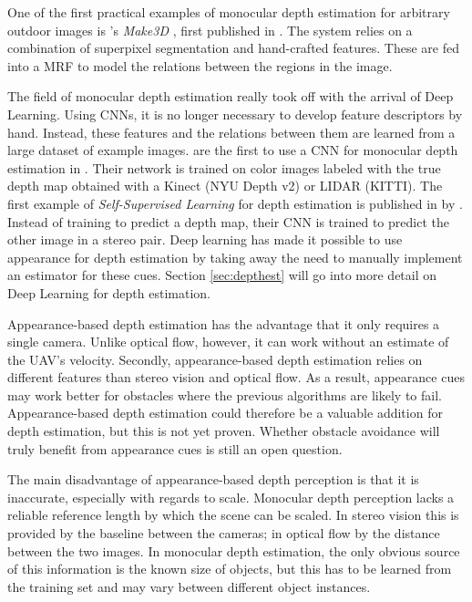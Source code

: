 \medskip

One of the first practical examples of monocular depth estimation for arbitrary outdoor images is \citeauthor{Saxena2006}'s \emph{Make3D} \cite{Saxena2006,Saxena2009}, first published in \citeyear{Saxena2006}.
The system relies on a combination of superpixel segmentation and hand-crafted features.
These are fed into a \ac{MRF} to model the relations between the regions in the image.

The field of monocular depth estimation really took off with the arrival of Deep Learning.
Using \acp{CNN}, it is no longer necessary to develop feature descriptors by hand.
Instead, these features and the relations between them are learned from a large dataset of example images.
\citeauthor{Eigen2014} are the first to use a \ac{CNN} for monocular depth estimation in \cite{Eigen2014,Eigen2015}.
Their network is trained on color images labeled with the true depth map obtained with a Kinect (NYU Depth v2) or LIDAR (KITTI).
The first example of \emph{Self-Supervised Learning} for depth estimation is published in \citeyear{Garg2016} by \citeauthor{Garg2016} \cite{Garg2016}.
Instead of training to predict a depth map, their \ac{CNN} is trained to predict the other image in a stereo pair.
Deep learning has made it possible to use appearance for depth estimation by taking away the need to manually implement an estimator for these cues.
Section \ref{sec:depthest} will go into more detail on Deep Learning for depth estimation.

\medskip

Appearance-based depth estimation has the advantage that it only requires a single camera.
Unlike optical flow, however, it can work without an estimate of the \ac{UAV}'s velocity.
Secondly, appearance-based depth estimation relies on different features than stereo vision and optical flow.
As a result, appearance cues may work better for obstacles where the previous algorithms are likely to fail.
Appearance-based depth estimation could therefore be a valuable addition for depth estimation, but this is not yet proven.
Whether obstacle avoidance will truly benefit from appearance cues is still an open question.

The main disadvantage of appearance-based depth perception is that it is inaccurate, especially with regards to scale.
Monocular depth perception lacks a reliable reference length by which the scene can be scaled.
In stereo vision this is provided by the baseline between the cameras; in optical flow by the distance between the two images.
In monocular depth estimation, the only obvious source of this information is the known size of objects, but this has to be learned from the training set and may vary between different object instances.

